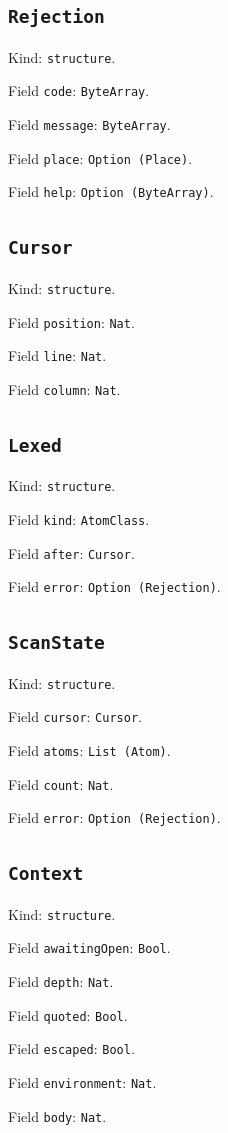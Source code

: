 \documentclass[11pt]{article}
\begin{document}
\subsection*{\texttt{Rejection}}
\noindent Kind: \texttt{structure}.\par
\noindent Field \texttt{code}: \texttt{ByteArray}.\par
\noindent Field \texttt{message}: \texttt{ByteArray}.\par
\noindent Field \texttt{place}: \texttt{Option (Place)}.\par
\noindent Field \texttt{help}: \texttt{Option (ByteArray)}.\par
\subsection*{\texttt{Cursor}}
\noindent Kind: \texttt{structure}.\par
\noindent Field \texttt{position}: \texttt{Nat}.\par
\noindent Field \texttt{line}: \texttt{Nat}.\par
\noindent Field \texttt{column}: \texttt{Nat}.\par
\subsection*{\texttt{Lexed}}
\noindent Kind: \texttt{structure}.\par
\noindent Field \texttt{kind}: \texttt{AtomClass}.\par
\noindent Field \texttt{after}: \texttt{Cursor}.\par
\noindent Field \texttt{error}: \texttt{Option (Rejection)}.\par
\subsection*{\texttt{ScanState}}
\noindent Kind: \texttt{structure}.\par
\noindent Field \texttt{cursor}: \texttt{Cursor}.\par
\noindent Field \texttt{atoms}: \texttt{List (Atom)}.\par
\noindent Field \texttt{count}: \texttt{Nat}.\par
\noindent Field \texttt{error}: \texttt{Option (Rejection)}.\par
\subsection*{\texttt{Context}}
\noindent Kind: \texttt{structure}.\par
\noindent Field \texttt{awaitingOpen}: \texttt{Bool}.\par
\noindent Field \texttt{depth}: \texttt{Nat}.\par
\noindent Field \texttt{quoted}: \texttt{Bool}.\par
\noindent Field \texttt{escaped}: \texttt{Bool}.\par
\noindent Field \texttt{environment}: \texttt{Nat}.\par
\noindent Field \texttt{body}: \texttt{Nat}.\par
\end{document}
